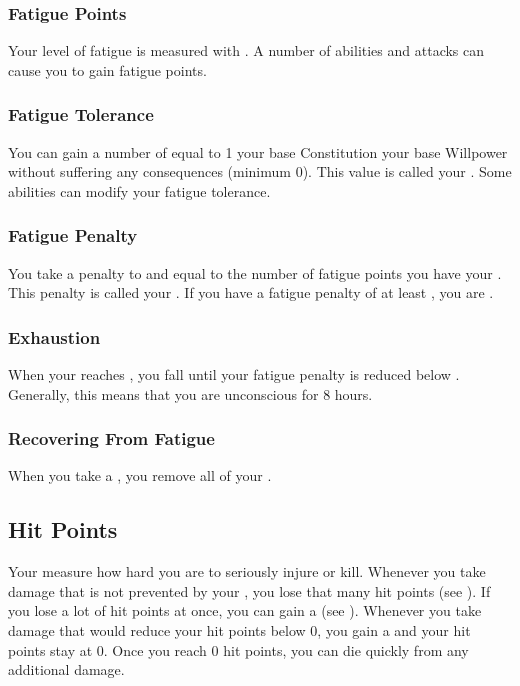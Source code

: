         \subsubsection{Fatigue Points}\label{Fatigue Points}
            Your level of fatigue is measured with .
            A number of abilities and attacks can cause you to gain fatigue points.

            \subsubsection{Fatigue Tolerance}\label{Fatigue Tolerance}
                You can gain a number of  equal to 1 \add your base Constitution \add your base Willpower without suffering any consequences (minimum 0).
                This value is called your .
                Some abilities can modify your fatigue tolerance.

            \subsubsection{Fatigue Penalty}\label{Fatigue Penalty}
                You take a penalty to  and  equal to the number of fatigue points you have \sub your .
                This penalty is called your .
                If you have a fatigue penalty of at least , you are .

        \subsubsection{Exhaustion}\label{Exhaustion}
            When your  reaches , you fall  until your fatigue penalty is reduced below .
            Generally, this means that you are unconscious for 8 hours.

        \subsubsection{Recovering From Fatigue}
            When you take a , you remove all of your .

    \subsection{Hit Points}\label{Hit Points}
        Your  measure how hard you are to seriously injure or kill.
        Whenever you take damage that is not prevented by your , you lose that many hit points (see ).
        If you lose a lot of hit points at once, you can gain a  (see ).
        Whenever you take damage that would reduce your hit points below 0, you gain a  and your hit points stay at 0.
        Once you reach 0 hit points, you can die quickly from any additional damage.

